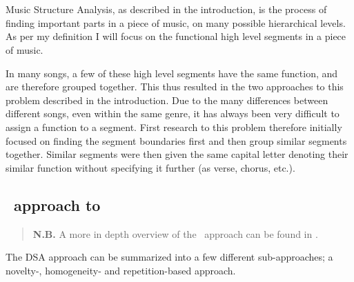 \section[MSA]{\msa}
Music Structure Analysis, as described in the introduction, is the process of finding important parts in a piece of music, on many possible hierarchical levels. As per my definition I will focus on the functional high level segments in a piece of music. 

In many songs, a few of these high level segments have the same function, and are therefore grouped together. This thus resulted in the two approaches to this problem described in the introduction. Due to the many differences between different songs, even within the same genre, it has always been very difficult to assign a function to a segment. First research to this problem therefore initially focused on finding the segment boundaries first and then group similar segments together. Similar segments were then given the same capital letter denoting their similar function without specifying it further (as verse, chorus, etc.).

\subsection[DSA approach to MSA]{\dsa\ approach to \msa}
\begin{quote}
    \textbf{N.B.} A more in depth overview of the \dsa\ approach can be found in \textcite{Jesperthesis}.
\end{quote}
The DSA approach can be summarized into a few different sub-approaches; a novelty-, homogeneity- and repetition-based approach.

